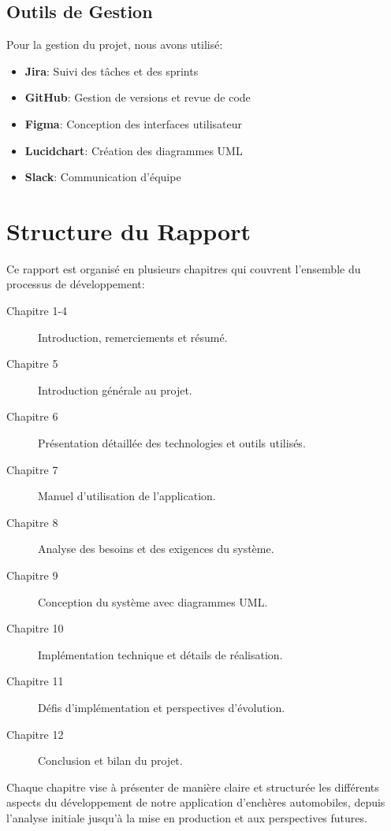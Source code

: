 \subsection{Outils de Gestion}

Pour la gestion du projet, nous avons utilisé:

\begin{itemize}
    \item \textbf{Jira}: Suivi des tâches et des sprints
    \item \textbf{GitHub}: Gestion de versions et revue de code
    \item \textbf{Figma}: Conception des interfaces utilisateur
    \item \textbf{Lucidchart}: Création des diagrammes UML
    \item \textbf{Slack}: Communication d'équipe
\end{itemize}

\section{Structure du Rapport}

Ce rapport est organisé en plusieurs chapitres qui couvrent l'ensemble du processus de développement:

\begin{description}
    \item[Chapitre 1-4] Introduction, remerciements et résumé.
    \item[Chapitre 5] Introduction générale au projet.
    \item[Chapitre 6] Présentation détaillée des technologies et outils utilisés.
    \item[Chapitre 7] Manuel d'utilisation de l'application.
    \item[Chapitre 8] Analyse des besoins et des exigences du système.
    \item[Chapitre 9] Conception du système avec diagrammes UML.
    \item[Chapitre 10] Implémentation technique et détails de réalisation.
    \item[Chapitre 11] Défis d'implémentation et perspectives d'évolution.
    \item[Chapitre 12] Conclusion et bilan du projet.
\end{description}

Chaque chapitre vise à présenter de manière claire et structurée les différents aspects du développement de notre application d'enchères automobiles, depuis l'analyse initiale jusqu'à la mise en production et aux perspectives futures.

